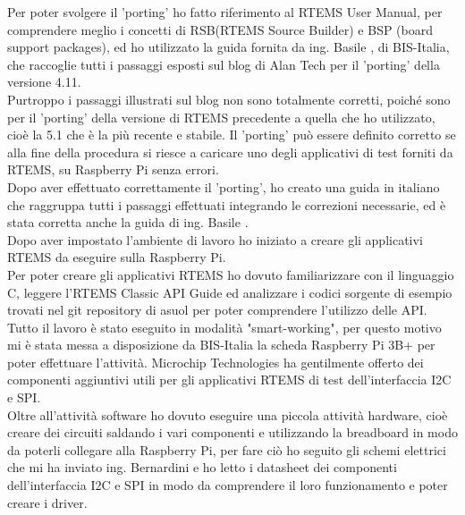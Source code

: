 \documentclass[12pt, a4paper, titlepage, oneside]{book}
\begin{document}
\begin{flushleft}
Per poter svolgere il 'porting' ho fatto riferimento al RTEMS User Manual\cite{rtemsUM}, per comprendere meglio i concetti di RSB(RTEMS Source Builder) e BSP (board support packages), 
ed ho utilizzato la guida fornita da ing. Basile \cite{giorgio}, di BIS-Italia, che raccoglie tutti i passaggi esposti sul blog di Alan Tech per il 'porting' della versione 4.11.\\
Purtroppo i passaggi illustrati sul blog non sono totalmente corretti, poiché sono per il 'porting' della versione di RTEMS precedente a quella che ho utilizzato, cioè la 5.1 che è la più recente e stabile.
Il 'porting' può essere definito corretto se alla fine della procedura si riesce a caricare uno degli applicativi di test forniti da RTEMS, su Raspberry Pi senza errori.\\
Dopo aver effettuato correttamente il 'porting', ho creato una guida in italiano  che raggruppa tutti i passaggi effettuati integrando le correzioni necessarie, ed è stata corretta anche la guida di ing. Basile \cite{giorgio5}.\\
Dopo aver impostato l'ambiente di lavoro ho iniziato a creare gli applicativi RTEMS da eseguire sulla Raspberry Pi.\\
Per poter creare gli applicativi RTEMS ho dovuto  familiarizzare con il linguaggio C, leggere l'RTEMS Classic API Guide \cite{rtemsCAG} ed analizzare i codici sorgente di esempio trovati nel git repository di asuol\cite{asuol} per poter comprendere l'utilizzo delle API. \\
Tutto il lavoro è stato eseguito in modalità "smart-working", per questo motivo mi è stata messa a disposizione da BIS-Italia la scheda Raspberry Pi 3B+ per poter effettuare l'attività. Microchip Technologies ha gentilmente offerto dei componenti aggiuntivi utili per gli applicativi RTEMS di test dell'interfaccia I2C e SPI.\\
Oltre all'attività software ho dovuto eseguire una piccola attività hardware, cioè creare dei circuiti saldando i vari componenti e utilizzando la breadboard in modo da poterli collegare alla Raspberry Pi, per fare ciò ho seguito gli schemi elettrici che mi ha inviato ing. Bernardini e ho letto i datasheet dei componenti dell'interfaccia I2C \cite{microchipMCP3425} \cite{microchipADC} e  SPI \cite{microchipMCP4822} \cite{microchipMSOP10-8} in modo da comprendere il loro funzionamento e poter creare i driver.\\


\end{flushleft}
\end{document}
